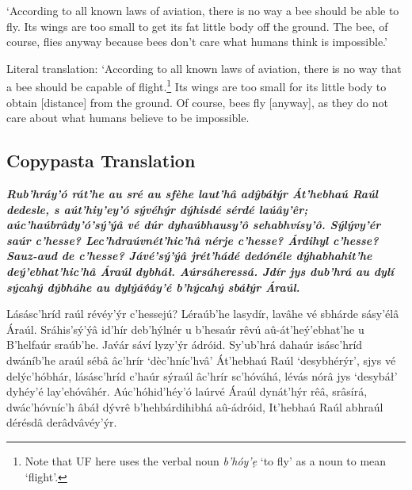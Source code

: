 \documentclass[a4paper, 12pt, twoside, final]{article}
\let \w \textit
\begin{document}
\medskip\noindent
‘According to all known laws of aviation, there is no way a bee should be able to fly. Its wings are too
small to get its fat little body off the ground. The bee, of course, flies anyway because bees don't care
what humans think is impossible.’

\medskip\noindent
Literal translation: ‘According to all known laws of aviation, there is no way that a bee should be capable of flight.\footnote{
Note that UF here uses the verbal noun \w{b’hóy’ẹ} ‘to fly’ as a noun to mean ‘flight’.}
Its wings are too small for its little body to obtain [distance] from the ground. Of course, bees fly [anyway], as
they do not care about what humans believe to be impossible.

\subsection{Copypasta Translation}
{\itshape\bfseries
Rub’hráy’ó rát’he au sré au sfèhe laut’hâ adŷbáłýr Át’hebhaú Raúl dedesle, s aút’hiy’ey’ó sývéhýr dýhisdé sérdé laúây’êr;
aúc’haúbrâdy’ó’sý’ýâ vé dúr dyhaúbhausy’ô sehabhvísy’ô. Sýlývy’ér saúr c’hesse? Lec’hdr\-aúv\-nét’hic’hâ nérje c’hesse?
Árdihyl c’hesse? Sauz-aud de c’hesse? Jávé’sý’ýâ jrét’hádé dedónéle dýha\-bha\-hit’he deý’ebhat’hic’hâ Áraúl dybháł.
Aúrsáheressá. Jdír jys dub’hrá au dylí sýcahý dýbháhe au dylýáv́áy’é b’hýcahý sbáłýr Áraúl.

Lásásc’hríd raúl révéy’ýr c’hessejú? Léraúb’he lasydír, lavâhe vé sbhárde sásy’élâ Áraúl. Sráhis’sý’ýâ id’hír deb’hýlnér
u b’hesaúr rêvú aû-át’heý’ebhat’he u B’helfaúr sraúb’he. Jav́ár sáví lyzy’ýr ádróid. Sy’u\-b’h\-rá dahaúr isásc’hríd
dwáníb’he araúl sébâ âc’hrír ‘dèc’hníc’hvâ’ Át’hebhaú Raúl ‘desybhérýr’, sjys vé delýc’hóbhár, lásásc’hríd c’haúr sýraúl
âc’hrír sc’hóváhá, lévás nórâ jys ‘desybáł’ dyhéy’é la\-y’e\-hó\-vâ\-hér. Aúc’hóhid’héy’ó laúrvé Áraúl dynát’hýr rêâ, srâsírá,
dwác’hóvníc’h âbáł dývrê b’hehbár\-di\-hi\-bhá aû-á\-dr\-ó\-id, It’hebhaú Raúl abhraúl dérésdâ derâdvâvéy’ýr.
}

\end{document}
